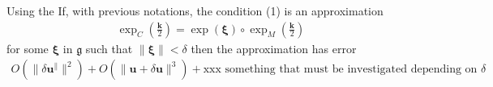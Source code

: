 \begin{corollary}
	Using the 
	If, with previous notations, the condition (1) is an approximation
	\begin{align*}
	\exp_{C}(\frac{\mathbf{k}}{2}) = \exp(\mathbf{\xi})\circ \exp_{M}(\frac{\mathbf{k}}{2}) 
	\end{align*}
	for some $ \mathbf{\xi}$ in  $\mathfrak{g}$ such that $\parallel\mathbf{\xi} \parallel < \delta$
	then the approximation has error
	\begin{align*}
	O(\parallel \delta\mathbf{u}^{\parallel} \parallel^{2} )  
	+ O(\parallel \mathbf{u} + \delta\mathbf{u}\parallel^{3})
	+ \text{xxx something that must be investigated depending on } \delta
	\end{align*}
\end{corollary}
